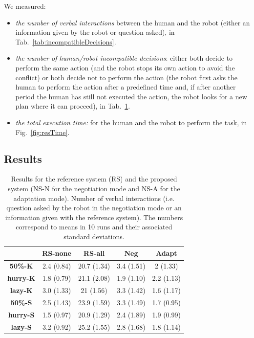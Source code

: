 \documentclass[english,a4paper,11pt,twoside]{StyleThese}
\begin{document}
We measured:
\begin{itemize}
\item \textit{the number of verbal interactions} between the human and the robot (either an information given by the robot or question asked), in Tab.~\ref{tab:incompatibleDecisions}.
\item \textit{the number of human/robot incompatible decisions}: either both decide to perform the same action (and the robot stops its own action to avoid the conflict) or both decide not to perform the action (the robot first asks the human to perform the action after a predefined time and, if after another period the human has still not executed the action, the robot looks for a new plan where it can proceed), in Tab.~\ref{tab:verbalInteraction}.
\item \textit{the total execution time:} for the human and the robot to perform the task, in Fig.~\ref{fig:resTime}.
\end{itemize}

\subsection{Results}

\begin{table}[!h]
\centering
  \begin{tabular}{|c||c|c|c|c|}
  \hline
     & \textbf{RS-none} & \textbf{RS-all} & \textbf{Neg} & \textbf{Adapt} \\
  \hline
  \hline
     \textbf{50\%-K} & 2.4 (0.84) & 20.7 (1.34) & 3.4 (1.51) & 2 (1.33) \\
  \hline
     \textbf{hurry-K} & 1.8 (0.79) & 21.1 (2.08) & 1.9 (1.10) & 2.2 (1.13) \\
  \hline
     \textbf{lazy-K} & 3.0 (1.33) & 21 (1.56) & 3.3 (1.42) & 1.6 (1.17) \\
  \hline
     \textbf{50\%-S} & 2.5 (1.43) & 23.9 (1.59) & 3.3 (1.49) & 1.7 (0.95)\\
  \hline
     \textbf{hurry-S} & 1.5 (0.97) & 20.9 (1.29) & 2.4 (1.89) & 1.9 (0.99)\\
  \hline
     \textbf{lazy-S} & 3.2 (0.92) & 25.2 (1.55) & 2.8 (1.68) & 1.8 (1.14)\\
  \hline
  \end{tabular}
   \caption{Results for the reference system (RS) and the proposed system (NS-N for the negotiation mode and NS-A for the adaptation mode). Number of verbal interactions (i.e. question asked by the robot in the negotiation mode or an information given with the reference system). The numbers correspond to means in 10 runs and their associated standard deviations.}
   \label{tab:verbalInteraction}
\end{table}
\end{document}
